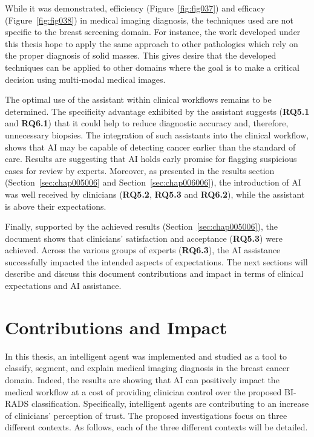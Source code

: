 While it was demonstrated, efficiency (Figure~\ref{fig:fig037}) and efficacy (Figure~\ref{fig:fig038}) in medical imaging diagnosis, the techniques used are not specific to the breast screening domain.
For instance, the work developed under this thesis hope to apply the same approach to other pathologies which rely on the proper diagnosis of solid masses.
This gives desire that the developed techniques can be applied to other domains where the goal is to make a critical decision using multi-modal medical images.

The optimal use of the assistant within clinical workflows remains to be determined.
The specificity advantage exhibited by the assistant suggests ({\bf RQ5.1} and {\bf RQ6.1}) that it could help to reduce diagnostic accuracy and, therefore, unnecessary biopsies.
The integration of such assistants into the clinical workflow, shows that \ac{AI} may be capable of detecting cancer earlier than the standard of care.
Results are suggesting that \ac{AI} holds early promise for flagging suspicious cases for review by experts.
Moreover, as presented in the results section (Section~\ref{sec:chap005006} and Section~\ref{sec:chap006006}), the introduction of \ac{AI} was well received by clinicians ({\bf RQ5.2}, {\bf RQ5.3} and {\bf RQ6.2}), while the assistant is above their expectations.

Finally, supported by the achieved results (Section~\ref{sec:chap005006}), the document shows that clinicians' satisfaction and acceptance ({\bf RQ5.3}) were achieved.
Across the various groups of experts ({\bf RQ6.3}), the \ac{AI} assistance successfully impacted the intended aspects of expectations.
The next sections will describe and discuss this document contributions and impact in terms of clinical expectations and \ac{AI} assistance.

\section{Contributions and Impact}
\label{sec:chap007002}

In this thesis, an intelligent agent was implemented and studied as a tool to classify, segment, and explain medical imaging diagnosis in the breast cancer domain.
Indeed, the results are showing that \ac{AI} can positively impact the medical workflow at a cost of providing clinician control over the proposed \ac{BI-RADS} classification.
Specifically, intelligent agents are contributing to an increase of clinicians' perception of trust.
The proposed investigations focus on three different contexts.
As follows, each of the three different contexts will be detailed.

